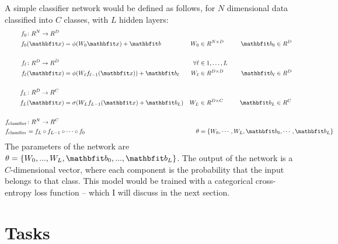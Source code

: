 A simple classifier network would be defined as follows, for $N$ dimensional data classified into $C$ classes, with $L$ hidden layers:
\begin{align}
\label{eqn:classifier}
\begin{aligned}
    \vfdef{f_0}{N}{D} \\
    f_{0}&(\x) = \phi(W_0 \x) + \vb &
    W_0 &\in \R^{N\times D} &
    \vb_0 &\in \R^{D}
\\ \\%
    \vfdef{f_\l}{D}{D} & \forall \l &\in 1,\dots,L \quad \\
    f_\l&(\x) = \phi(W_\l f_{\l-1}(\x)) + \vb_\l &
    W_\l &\in \R^{D\times D} \quad &
    \vb_\l &\in \R^{D}
\\ \\%
    \vfdef{f_L}{D}{C} \\
    f_{L}&(\x) = \sigma(W_L f_{L-1}(\x) + \vb_L) &
    W_L &\in \R^{D \times C} &
    \vb_L &\in \R^{C}
\\ \\%
    \vfdef{f_{\text{classifier}}}{N}{C} \\
    f_{\text{classifier}}& = f_L \circ f_{L-1} \circ \cdots \circ f_0 &
    \theta &= \rlap{\{$W_0, \cdots, W_L, \vb_0, \cdots, \vb_L \} $}
\end{aligned}
\end{align}
The parameters of the network are $\theta = \{W_0, ..., W_L, \vb_0, ..., \vb_{L}\}$. The output of the network is a $C$-dimensional vector, where each component is the probability that the input belongs to that class. This model would be trained with a categorical cross-entropy loss function -- which I will discuss in the next section.


\section{Tasks}
\label{s:tasks}

